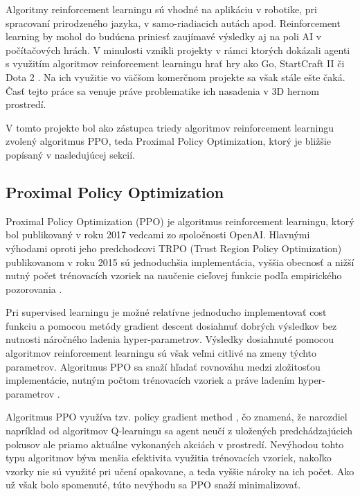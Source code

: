 \documentclass[slovak, master]{diploma}
\begin{document}
Algoritmy reinforcement learningu sú vhodné na aplikáciu v robotike, pri spracovaní prirodzeného jazyka, v samo-riadiacich autách apod. Reinforcement learning by mohol do budúcna priniesť zaujímavé výsledky aj na poli AI v počítačových hrách. V minulosti vznikli projekty v rámci ktorých dokázali agenti s využitím algoritmov reinforcement learningu hrať hry ako Go, StartCraft II či Dota 2 \cite{app13042443}. Na ich využitie vo väčšom komerčnom projekte sa však stále ešte čaká. Časť tejto práce sa venuje práve problematike ich nasadenia v 3D hernom prostredí.

V tomto projekte bol ako zástupca triedy algoritmov reinforcement learningu zvolený algoritmus PPO, teda Proximal Policy Optimization, ktorý je bližšie popísaný v nasledujúcej sekcií.


\subsection{Proximal Policy Optimization}
\label{sec:PPO}
Proximal Policy Optimization (PPO) je algoritmus reinforcement learningu, ktorý bol publikovaný v roku 2017 vedcami zo spoločnosti OpenAI. Hlavnými výhodami oproti jeho predchodcovi TRPO (Trust Region Policy Optimization) publikovanom v roku 2015 sú jednoduchšia implementácia, vyššia obecnosť a nižší nutný počet trénovacích vzoriek na naučenie cieľovej funkcie podľa empirického pozorovania \cite{PPOPaper}.

Pri supervised learningu je možné relatívne jednoducho implementovať cost funkciu a pomocou metódy gradient descent dosiahnuť dobrých výsledkov bez nutnosti náročného ladenia hyper-parametrov. Výsledky dosiahnuté pomocou algoritmov reinforcement learningu sú však veľmi citlivé na zmeny týchto parametrov. Algoritmus PPO sa snaží hľadať rovnováhu medzi zložitosťou implementácie, nutným počtom trénovacích vzoriek a práve ladením hyper-parametrov \cite{PPOPaper}.

Algoritmus PPO využíva tzv. policy gradient method \cite{PPOPaper}, čo znamená, že narozdiel napríklad od algoritmov Q-learningu sa agent neučí z uložených predchádzajúcich pokusov ale priamo aktuálne vykonaných akciách v prostredí. Nevýhodou tohto typu algoritmov býva menšia efektivita využitia trénovacích vzoriek, nakoľko vzorky nie sú využité pri učení opakovane, a teda vyššie nároky na ich počet. Ako už však bolo spomenuté, túto nevýhodu sa PPO snaží minimalizovať.  
\end{document}

